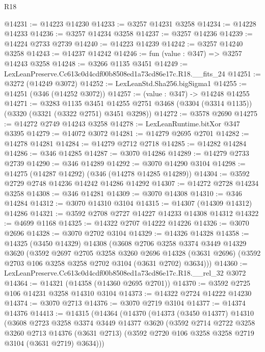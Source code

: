 \begin{lexlean}{R18}
\begin{coremodule}
@14231 := @14223 @14230
@14233 := @3257 @14231 @3258
@14234 := @14228 @14233
@14236 := @3257 @14234 @3258
@14237 := @3257 @14236
@14239 := @14224 @2733 @2739
@14240 := @14223 @14239
@14242 := @3257 @14240 @3258
@14243 := @14237 @14242
@14246 := fun (value : @347) => @3257 @14243 @3258
@14248 := @3266 @1135 @3451
@14249 := LexLeanPreserve.Cc613c0d4cdf00b8508ed1a73cd86e17c.R18.__fits_24
@14251 := @3272 (@14249 @3072)
@14252 := LexLeanStd.Sha256.bigSigma1
@14255 := @14251 (@346 (@14252 @3072))
@14257 := (value : @347) -> @14248 @14255
@14271 := @3283
    @1135
    @3451
    @14255
    @2751
    @3468
    (@3304 (@3314 @1135))
    (@3320 (@3321 (@3322 @2751) @3451 @3298))
@14272 := @3578 @2690
@14275 := @14272 @2749 @14243 @3258
@14278 := LexLeanRuntime.bitXor @347 @3395
@14279 := @14072 @3072
@14281 := @14279 @2695 @2701
@14282 := @14278 @14281
@14284 := @14279 @2712 @2718
@14285 := @14282 @14284
@14286 := @346 @14285
@14287 := @3070 @14286
@14289 := @14279 @2733 @2739
@14290 := @346 @14289
@14292 := @3070 @14290 @3104
@14298 := @14275 (@14287 @14292) (@346 (@14278 @14285 @14289))
@14304 := @3592 @2729 @2748 @14236 @14242 @14286 @14292
@14307 := @14272 @2728 @14234 @3258
@14308 := @346 @14281
@14309 := @3070 @14308
@14310 := @346 @14284
@14312 := @3070 @14310 @3104
@14315 := @14307 (@14309 @14312) @14286
@14321 := @3592 @2708 @2727 @14227 @14233 @14308 @14312
@14322 := @4699 @1168
@14325 := @14322 @2707 @14222 @14226
@14326 := @3070 @2696
@14328 := @3070 @2702 @3104
@14329 := @14326 @14328
@14358 := @14325
    (@3450 @14329)
    @14308
    (@3608
      @2706
      @3258
      @3374
      @3449
      @14329
      @3620
      (@3592
        @2697
        @2705
        @3258
        @3260
        @2696
        @14328
        (@3631 @2696)
        (@3592 @2703 @106 @3258 @3258 @2702 @3104 (@3631 @2702) @3634)))
@14360 := LexLeanPreserve.Cc613c0d4cdf00b8508ed1a73cd86e17c.R18.__rel_32 @3072
@14364 := @14321 (@14358 (@14360 @2695 @2701))
@14370 := @3592 @2725 @106 @14231 @3258 @14310 @3104
@14373 := @14322 @2724 @14222 @14230
@14374 := @3070 @2713
@14376 := @3070 @2719 @3104
@14377 := @14374 @14376
@14413 := @14315
    (@14364
      (@14370
        (@14373
          (@3450 @14377)
          @14310
          (@3608
            @2723
            @3258
            @3374
            @3449
            @14377
            @3620
            (@3592
              @2714
              @2722
              @3258
              @3260
              @2713
              @14376
              (@3631 @2713)
              (@3592 @2720 @106 @3258 @3258 @2719 @3104 (@3631 @2719) @3634)))

\end{coremodule}
\end{lexlean}
